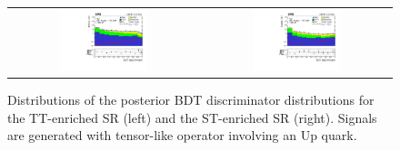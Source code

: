\begin{figure}[tbh!]
 \begin{center}
 \begin{tabular}{cc}
  \includegraphics[width=0.48\textwidth]{figures/Part3/Results/BDT_TT_TensorU}&
  \includegraphics[width=0.48\textwidth]{figures/Part3/Results/BDT_ST_TensorU}\\
 \end{tabular}
 \caption{Distributions of the posterior BDT discriminator distributions for the TT-enriched SR (left) and the ST-enriched SR (right). Signals are generated with tensor-like operator involving an Up quark. }
 \label{fig:bdt_postfit_TensorU}
 \end{center}
\end{figure} 

